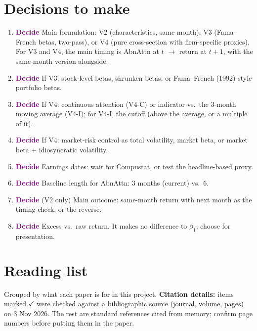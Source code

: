 \documentclass[11pt]{article}
\newcommand{\decide}{\textcolor{Purple}{\textbf{Decide}}}
\begin{document}
\section{Decisions to make}
\begin{enumerate}
  \item \decide{} Main formulation: V2 (characteristics, same month), V3 (Fama--French betas, two-pass), or V4 (pure cross-section with firm-specific proxies). For V3 and V4, the main timing is AbnAttn at $t$ $\rightarrow$ return at $t+1$, with the same-month version alongside.
  \item \decide{} If V3: stock-level betas, shrunken betas, or Fama--French (1992)-style portfolio betas.
  \item \decide{} If V4: continuous attention (V4-C) or indicator vs.\ the 3-month moving average (V4-I); for V4-I, the cutoff (above the average, or a multiple of it).
  \item \decide{} If V4: market-risk control as total volatility, market beta, or market beta + idiosyncratic volatility.
  \item \decide{} Earnings dates: wait for Compustat, or test the headline-based proxy.
  \item \decide{} Baseline length for AbnAttn: 3 months (current) vs.\ 6.
  \item \decide{} (V2 only) Main outcome: same-month return with next month as the timing check, or the reverse.
  \item \decide{} Excess vs.\ raw return. It makes no difference to $\beta_1$; choose for presentation.
\end{enumerate}


\section{Reading list}\label{sec:reading}

Grouped by what each paper is for in this project. \textbf{Citation details:} items marked $\checkmark$ were checked against a bibliographic source (journal, volume, pages) on 3 Nov 2026. The rest are standard references cited from memory; confirm page numbers before putting them in the paper.
\end{document}
